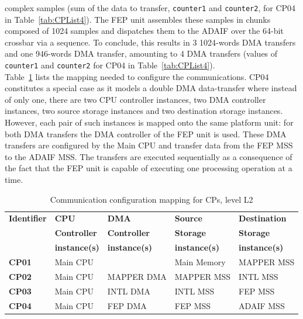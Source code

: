 \documentclass{llncs}
\begin{document}
complex samples (sum of the data to transfer, \texttt{counter1} and \texttt{counter2}, for CP04 in
Table~\ref{tab:CPList4}).
%
%
The FEP unit assembles these samples in chunks composed of 1024 samples and dispatches them to the ADAIF over the
64-bit crossbar via a sequence. To conclude, this results in 3 1024-words DMA transfers and one 946-words DMA
transfer, amounting to 4 DMA transfers (values of \texttt{counter1} and \texttt{counter2} for CP04 in
Table~\ref{tab:CPList4}).\\
%
Table~\ref{tab:MappingL2} lists the mapping needed to configure the communications. CP04 constitutes a special case as
it models a double DMA data-transfer where instead of only one, there are two CPU controller instances, two DMA
controller instances, two source storage instances and two destination storage instances. However, each pair of such
instances is mapped onto the same platform unit: for both DMA transfers the DMA controller of the FEP unit is used.
These DMA transfers are configured by the Main CPU and transfer data from the FEP MSS to the ADAIF MSS. The transfers
are executed sequentially as a consequence of the fact that the FEP unit is capable of executing one processing
operation at a time.
%
\begin{table}
\centering
\caption{Communication configuration mapping for CPs, level L2}
\label{tab:MappingL2}
\begin{tabular}{| >{\centering\arraybackslash}l | >{\centering\arraybackslash}l | >{\centering\arraybackslash}l |
>{\centering\arraybackslash}l | >{\centering\arraybackslash}l |}
	\hline
		\textbf{Identifier}	& \textbf{CPU} 					& \textbf{DMA} 					& \textbf{Source} 			& \textbf{Destination} \\
												& \textbf{Controller}		& \textbf{Controller}		& \textbf{Storage} 			& \textbf{Storage} \\
												&	\textbf{instance(s)}	& \textbf{instance(s)}	& \textbf{instance(s)}	& \textbf{instance(s)} \\ \hline
		\textbf{CP01}		& Main CPU &  					& Main Memory & MAPPER MSS \\ \hline
		\textbf{CP02}		& Main CPU & MAPPER DMA & MAPPER MSS 	& INTL MSS \\ \hline
		\textbf{CP03} 	& Main CPU & INTL DMA 	& INTL MSS 		& FEP MSS \\ \hline
		\textbf{CP04} 	& Main CPU & FEP DMA 		& FEP MSS			& ADAIF MSS \\ \hline
\end{tabular}
\end{table}
\end{document}
